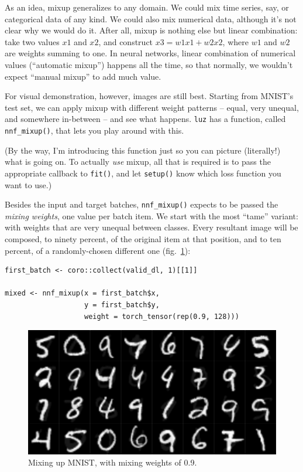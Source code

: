 \documentclass[
  letterpaper,
]{krantz}
\begin{document}
As an idea, mixup generalizes to any domain. We could mix time series,
say, or categorical data of any kind. We could also mix numerical data,
although it's not clear why we would do it. After all, mixup is nothing
else but linear combination: take two values \(x1\) and \(x2\), and
construct \(x3 = w1 x1 + w2 x2\), where \(w1\) and \(w2\) are weights
summing to one. In neural networks, linear combination of numerical
values (``automatic mixup'') happens all the time, so that normally, we
wouldn't expect ``manual mixup'' to add much value.

For visual demonstration, however, images are still best. Starting from
MNIST's test set, we can apply mixup with different weight patterns --
equal, very unequal, and somewhere in-between -- and see what happens.
\texttt{luz} has a function, called
\texttt{nnf\_mixup()},
that lets you play around with this.

(By the way, I'm introducing this function just so you can picture
(literally!) what is going on. To actually \emph{use} mixup, all that is
required is to pass the appropriate callback to \texttt{fit()}, and let
\texttt{setup()} know which loss function you want to use.)

Besides the input and target batches, \texttt{nnf\_mixup()} expects to
be passed the \emph{mixing weights}, one value per batch item. We start
with the most ``tame'' variant: with weights that are very unequal
between classes. Every resultant image will be composed, to ninety
percent, of the original item at that position, and to ten percent, of a
randomly-chosen different one
(fig.~\ref{fig-overfitting-mnist-mixup-0.9}):

\begin{verbatim}
first_batch <- coro::collect(valid_dl, 1)[[1]]

mixed <- nnf_mixup(x = first_batch$x,
                   y = first_batch$y,
                   weight = torch_tensor(rep(0.9, 128)))
\end{verbatim}

\begin{figure}[H]

{\centering \includegraphics{images/overfitting-mnist-mixup-0.9.png}

}

\caption{\label{fig-overfitting-mnist-mixup-0.9}Mixing up MNIST, with
mixing weights of 0.9.}

\end{figure}
\end{document}
